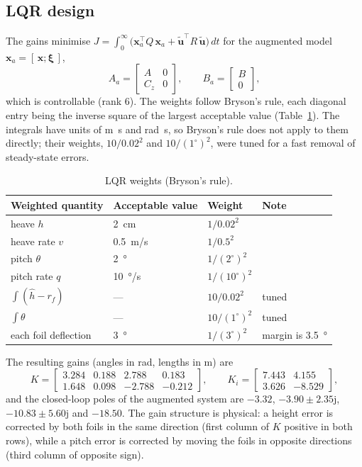 \documentclass[11pt,a4paper]{article}
\newcommand{\T}{^{\top}}
\begin{document}
\subsection{LQR design}

The gains minimise
$J=\int_0^\infty \bigl(\bm x_a\T Q\,\bm x_a + \tilde{\bm u}\T R\,\tilde{\bm u}\bigr)\,dt$
for the augmented model $\bm x_a=[\,\bm x;\bm\xi\,]$,
\[
A_a=\begin{bmatrix}A & 0\\ C_z & 0\end{bmatrix},\qquad
B_a=\begin{bmatrix}B\\ 0\end{bmatrix},
\]
which is controllable (rank 6). The weights follow Bryson's rule, each diagonal
entry being the inverse square of the largest acceptable value
(Table~\ref{tab:weights}). The integrals have units of \si{m.s} and
\si{rad.s}, so Bryson's rule does not apply to them directly; their weights,
$10/0.02^2$ and $10/(1^\circ)^2$, were tuned for a fast removal of steady-state
errors.

\begin{table}[htbp]
\centering
\caption{LQR weights (Bryson's rule).}
\label{tab:weights}
\begin{tabular}{@{}llll@{}}
\toprule
Weighted quantity & Acceptable value & Weight & Note \\ \midrule
heave $h$ & \SI{2}{cm} & $1/0.02^2$ & \\
heave rate $v$ & \SI{0.5}{m/s} & $1/0.5^2$ & \\
pitch $\theta$ & \SI{2}{\degree} & $1/(2^\circ)^2$ & \\
pitch rate $q$ & \SI{10}{\degree/s} & $1/(10^\circ)^2$ & \\
$\int(\hat h-r_f)$ & --- & $10/0.02^2$ & tuned \\
$\int\theta$ & --- & $10/(1^\circ)^2$ & tuned \\
each foil deflection & \SI{3}{\degree} & $1/(3^\circ)^2$ & margin is \SI{3.5}{\degree} \\
\bottomrule
\end{tabular}
\end{table}

The resulting gains (angles in rad, lengths in m) are
\[
K=\begin{bmatrix}3.284 & 0.188 & 2.788 & 0.183\\ 1.648 & 0.098 & -2.788 & -0.212\end{bmatrix},\qquad
K_i=\begin{bmatrix}7.443 & 4.155\\ 3.626 & -8.529\end{bmatrix},
\]
and the closed-loop poles of the augmented system are
$-3.32$, $-3.90\pm2.35\mathrm{j}$, $-10.83\pm5.60\mathrm{j}$ and $-18.50$.
The gain structure is physical: a height error is corrected by both foils in
the same direction (first column of $K$ positive in both rows), while a pitch
error is corrected by moving the foils in opposite directions (third column of
opposite sign).
\end{document}
